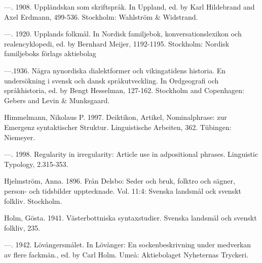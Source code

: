 \begin{styleBodytextC}
—. 1908. Uppländskan som skriftspråk. In Uppland, ed. by Karl Hildebrand and Axel Erdmann, 499-536. Stockholm: Wahlström \& Widstrand.

\end{styleBodytextC}

\begin{styleBodytextC}
—. 1920. Upplands folkmål. In Nordisk familjebok, konversationslexikon och realencyklopedi, ed. by Bernhard Meijer, 1192-1195. Stockholm: Nordisk familjeboks förlags aktiebolag 

\end{styleBodytextC}

\begin{styleBodytextC}
—.1936. Några nynordiska dialektformer och vikingatidens historia. En undersökning i svensk och dansk språkutveckling. In Ordgeografi och språkhistoria, ed. by Bengt Hesselman, 127-162. Stockholm and Copenhagen: Gebers and Levin \& Munksgaard. 

\end{styleBodytextC}

\begin{styleBodytextC}
Himmelmann, Nikolaus P. 1997. Deiktikon, Artikel, Nominalphrase: zur Emergenz syntaktischer Struktur. Linguistische Arbeiten, 362. Tübingen: Niemeyer.

\end{styleBodytextC}

\begin{styleBodytextC}
—. 1998. Regularity in irregularity: Article use in adpositional phrases. Linguistic Typology, 2.315-353.

\end{styleBodytextC}

\begin{styleBodytextC}
Hjelmström, Anna. 1896. Från Delsbo: Seder och bruk, folktro och sägner, person- och tidsbilder upptecknade. Vol. 11:4: Svenska landsmål ock svenskt folkliv. Stockholm.

\end{styleBodytextC}

\begin{styleBodytextC}
Holm, Gösta. 1941. Västerbottniska syntaxstudier. Svenska landsmål och svenskt folkliv, 235.

\end{styleBodytextC}

\begin{styleBodytextC}
—. 1942. Lövångersmålet. In Lövånger: En sockenbeskrivning under medverkan av flere fackmän., ed. by Carl Holm. Umeå: Aktiebolaget Nyheternas Tryckeri.

\end{styleBodytextC}

